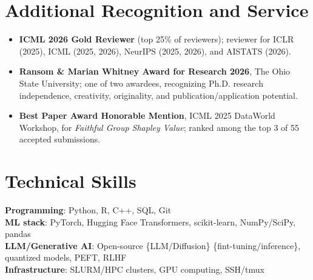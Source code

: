 \documentclass[letterpaper,10pt]{article}
\begin{document}
\section{Additional Recognition and Service}
\begin{itemize}
  \item \textbf{ICML 2026 Gold Reviewer} (top 25\% of reviewers); reviewer for ICLR (2025), ICML (2025, 2026), NeurIPS (2025, 2026), and AISTATS (2026).
  \item \textbf{Ransom \& Marian Whitney Award for Research 2026}, The Ohio State University; one of two awardees, recognizing Ph.D. research independence, creativity, originality, and publication/application potential.
  \item \textbf{Best Paper Award Honorable Mention}, ICML 2025 DataWorld Workshop, for \textit{Faithful Group Shapley Value}; ranked among the top 3 of 55 accepted submissions.
\end{itemize}

\section{Technical Skills}
\textbf{Programming}: Python, R, C++, SQL, Git\\
\textbf{ML stack}: PyTorch, Hugging Face Transformers, scikit-learn, NumPy/SciPy, pandas\\
\textbf{LLM/Generative AI}: Open-source \{LLM/Diffusion\} \{fint-tuning/inference\}, quantized models, PEFT, RLHF\\
\textbf{Infrastructure}: SLURM/HPC clusters, GPU computing, SSH/tmux
\end{document}
